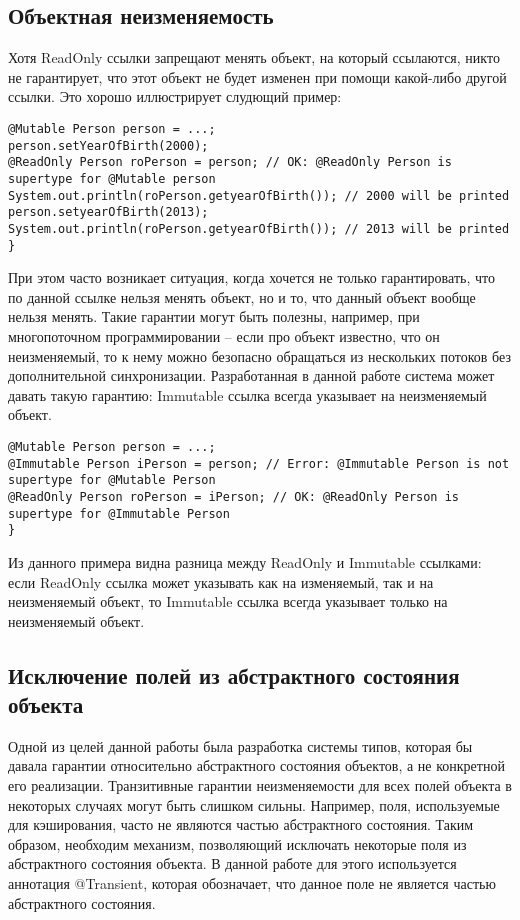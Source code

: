 \subsection{Объектная неизменяемость}

Хотя ReadOnly ссылки запрещают менять объект, на который ссылаются, никто не гарантирует, что этот объект не будет изменен при помощи какой-либо другой ссылки. Это хорошо иллюстрирует слудющий пример:

\begin{lstlisting}[caption=Изменение объекта\, хранимого по ReadOnly ссылке, label=code:change_ro_object]
@Mutable Person person = ...;
person.setYearOfBirth(2000);
@ReadOnly Person roPerson = person; // OK: @ReadOnly Person is supertype for @Mutable person
System.out.println(roPerson.getyearOfBirth()); // 2000 will be printed
person.setyearOfBirth(2013);
System.out.println(roPerson.getyearOfBirth()); // 2013 will be printed			
}
\end{lstlisting} 

При этом часто возникает ситуация, когда хочется не только гарантировать, что по данной ссылке нельзя менять объект, но и то, что данный объект вообще нельзя менять. Такие гарантии могут быть полезны, например, при многопоточном программировании -- если про объект известно, что он неизменяемый, то к нему можно безопасно обращаться из нескольких потоков без дополнительной синхронизации. Разработанная в данной работе система может давать такую гарантию: Immutable ссылка всегда указывает на неизменяемый объект. 

\begin{lstlisting}[caption=Mutable и Immutable ссылки, label=code:mutable_vs_immutable]
@Mutable Person person = ...;
@Immutable Person iPerson = person; // Error: @Immutable Person is not supertype for @Mutable Person
@ReadOnly Person roPerson = iPerson; // OK: @ReadOnly Person is supertype for @Immutable Person
}
\end{lstlisting} 

Из данного примера видна разница между ReadOnly и Immutable ссылками: если ReadOnly ссылка может указывать как на изменяемый, так и на неизменяемый объект, то Immutable ссылка всегда указывает только на неизменяемый объект.  

\subsection{Исключение полей из абстрактного состояния объекта}

Одной из целей данной работы была разработка системы типов, которая бы давала гарантии относительно абстрактного состояния объектов, а не конкретной его реализации. Транзитивные гарантии неизменяемости для всех полей объекта в некоторых случаях могут быть слишком сильны. Например, поля, используемые для кэширования, часто не являются частью абстрактного состояния. Таким образом, необходим механизм, позволяющий исключать некоторые поля из абстрактного состояния объекта. В данной работе для этого используется аннотация @Transient, которая обозначает, что данное поле не является частью абстрактного состояния. 

